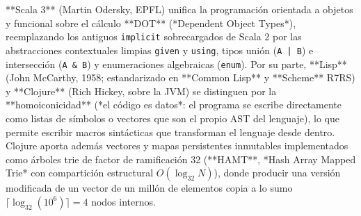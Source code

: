 \documentclass{book}
\begin{document}
**Scala 3** (Martin Odersky, EPFL) unifica la programación orientada a objetos y funcional sobre el cálculo **DOT** (*Dependent Object Types*), reemplazando los antiguos \texttt{implicit} sobrecargados de Scala 2 por las abstracciones contextuales limpias \texttt{given} y \texttt{using}, tipos unión (\texttt{A | B}) e intersección (\texttt{A \& B}) y enumeraciones algebraicas (\texttt{enum}). Por su parte, **Lisp** (John McCarthy, 1958; estandarizado en **Common Lisp** y **Scheme** R7RS) y **Clojure** (Rich Hickey, sobre la JVM) se distinguen por la **homoiconicidad** (*el código es datos*: el programa se escribe directamente como listas de símbolos o vectores que son el propio AST del lenguaje), lo que permite escribir macros sintácticas que transforman el lenguaje desde dentro. Clojure aporta además vectores y mapas persistentes inmutables implementados como árboles trie de factor de ramificación 32 (**HAMT**, *Hash Array Mapped Trie* con compartición estructural \(O(\log_{32} N)\)), donde producir una versión modificada de un vector de un millón de elementos copia a lo sumo \(\lceil \log_{32}(10^6) \rceil = 4\) nodos internos.
\end{document}
